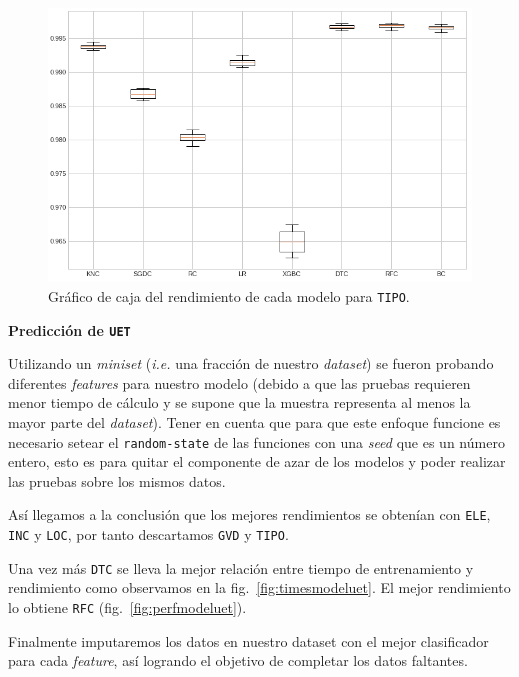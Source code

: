 \documentclass[a4paper,12pt]{article}
\begin{document}
\begin{figure}[H]
	\begin{center}
	\includegraphics[width=1\textwidth]{tipoperf.png}
  	\caption{Gráfico de caja del rendimiento de cada modelo para \texttt{TIPO}.}
  	\label{fig:boxplotmodeltype}
  	\end{center}
\end{figure}

\textbf{Predicción de \texttt{UET}}

Utilizando un \textit{miniset} (\textit{i.e.} una fracción de nuestro \textit{dataset}) se fueron probando diferentes \textit{features} para nuestro modelo (debido a que las pruebas requieren menor tiempo de cálculo y se supone que la muestra representa al menos la mayor parte del \textit{dataset}). Tener en cuenta que para que este enfoque funcione es necesario setear el \texttt{random-state} de las funciones con una \textit{seed} que es un número entero, esto es para quitar el componente de azar de los modelos y poder realizar las pruebas sobre los mismos datos.

Así llegamos a la conclusión que los mejores rendimientos se obtenían con \texttt{ELE}, \texttt{INC} y \texttt{LOC}, por tanto descartamos \texttt{GVD} y \texttt{TIPO}.

Una vez más \texttt{DTC} se lleva la mejor relación entre tiempo de entrenamiento y rendimiento como observamos en la fig.~\ref{fig:timesmodeluet}. El mejor rendimiento lo obtiene \texttt{RFC} (fig.~\ref{fig:perfmodeluet}).

Finalmente imputaremos los datos en nuestro dataset con el mejor clasificador para cada \textit{feature}, así logrando el objetivo de completar los datos faltantes.
\end{document}
